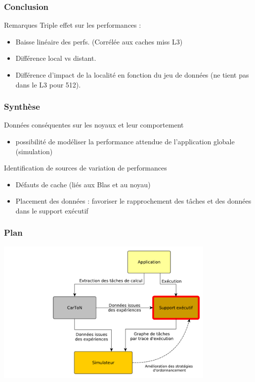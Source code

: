 \documentclass[xcolor={usenames,dvipsnames,svgnames,table}, aspectratio=43]{beamer}
\begin{document}
\begin{frame}
  \frametitle{Conclusion}
  \begin{block}{Remarques}
    Triple effet sur les performances :
    \begin{itemize}
      \item Baisse linéaire des perfs. (Corrélée aux caches miss L3)
      \item Différence local vs distant.
      \item Différence d'impact de la localité en fonction du jeu de données (ne tient pas dans le L3 pour 512).
    \end{itemize}
  \end{block}


\end{frame}

\begin{frame}
\frametitle{Synthèse}


Données conséquentes sur les noyaux et leur comportement

\begin{itemize}
  \item possibilité de modéliser la performance attendue de l'application globale (simulation)
\end{itemize}

Identification de sources de variation de performances

\begin{itemize}
  \item Défauts de cache (liés aux Blas et au noyau)
  \item Placement des données : favoriser le rapprochement des tâches et des données dans le support exécutif
\end{itemize}

\end{frame}

\begin{frame}
  \frametitle{Plan}
  \includegraphics[width=0.8\textwidth]{graph/big_picture-part2.pdf}
\end{frame}
\end{document}
